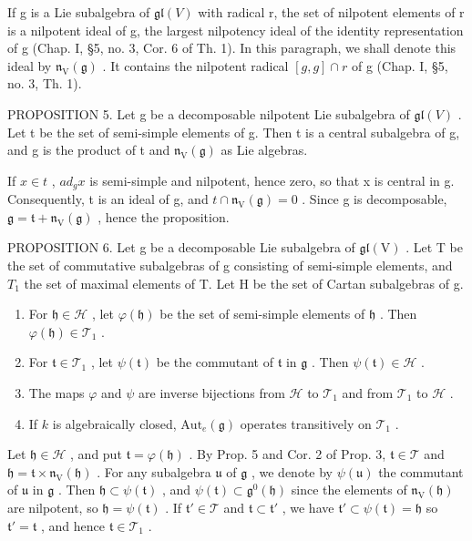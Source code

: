 If g is a Lie subalgebra of \(\mathfrak{gl}(V)\) with radical r, the set of nilpotent elements of r is a nilpotent ideal of g, the largest nilpotency ideal of the identity representation of g (Chap. I, §5, no. 3, Cor. 6 of Th. 1). In this paragraph, we shall denote this ideal by \(\mathfrak{n}_{\mathrm{V}}(\mathfrak{g})\) . It contains the nilpotent radical \([g,g]\cap r\) of g (Chap. I, §5, no. 3, Th. 1).

PROPOSITION 5. Let g be a decomposable nilpotent Lie subalgebra of \(\mathfrak{gl}(V)\) . Let t be the set of semi-simple elements of g. Then t is a central subalgebra of g, and g is the product of t and \(\mathfrak{n}_{\mathrm{V}}(\mathfrak{g})\) as Lie algebras.

If \(x \in t\) , \(ad_{g}x\) is semi-simple and nilpotent, hence zero, so that x is central in g. Consequently, t is an ideal of g, and \(t \cap \mathfrak{n}_{\mathrm{V}}(\mathfrak{g}) = 0\) . Since g is decomposable, \(\mathfrak{g} = \mathfrak{t} + \mathfrak{n}_{\mathrm{V}}(\mathfrak{g})\) , hence the proposition.

PROPOSITION 6. Let g be a decomposable Lie subalgebra of \(\mathfrak{gl}(\mathrm{V})\) . Let T be the set of commutative subalgebras of g consisting of semi-simple elements, and \(T_{1}\) the set of maximal elements of T. Let H be the set of Cartan subalgebras of g.

\begin{enumerate}
\def\labelenumi{(\roman{enumi})}
\item
  For \(\mathfrak{h} \in \mathcal{H}\) , let \(\varphi(\mathfrak{h})\) be the set of semi-simple elements of \(\mathfrak{h}\) . Then \(\varphi(\mathfrak{h}) \in \mathcal{T}_1\) .
\item
  For \(\mathfrak{t} \in \mathcal{T}_1\) , let \(\psi(\mathfrak{t})\) be the commutant of \(\mathfrak{t}\) in \(\mathfrak{g}\) . Then \(\psi(\mathfrak{t}) \in \mathscr{H}\) .
\item
  The maps \(\varphi\) and \(\psi\) are inverse bijections from \(\mathcal{H}\) to \(\mathcal{T}_1\) and from \(\mathcal{T}_1\) to \(\mathcal{H}\) .
\item
  If \(k\) is algebraically closed, \(\mathrm{Aut}_e(\mathfrak{g})\) operates transitively on \(\mathcal{T}_1\) .
\end{enumerate}

Let \(\mathfrak{h} \in \mathcal{H}\) , and put \(\mathfrak{t} = \varphi(\mathfrak{h})\) . By Prop. 5 and Cor. 2 of Prop. 3, \(\mathfrak{t} \in \mathcal{T}\) and \(\mathfrak{h} = \mathfrak{t} \times \mathfrak{n}_{\mathrm{V}}(\mathfrak{h})\) . For any subalgebra \(\mathfrak{u}\) of \(\mathfrak{g}\) , we denote by \(\psi(\mathfrak{u})\) the commutant of \(\mathfrak{u}\) in \(\mathfrak{g}\) . Then \(\mathfrak{h} \subset \psi(\mathfrak{t})\) , and \(\psi(\mathfrak{t}) \subset \mathfrak{g}^0(\mathfrak{h})\) since the elements of \(\mathfrak{n}_{\mathrm{V}}(\mathfrak{h})\) are nilpotent, so \(\mathfrak{h} = \psi(\mathfrak{t})\) . If \(\mathfrak{t}' \in \mathcal{T}\) and \(\mathfrak{t} \subset \mathfrak{t}'\) , we have \(\mathfrak{t}' \subset \psi(\mathfrak{t}) = \mathfrak{h}\) so \(\mathfrak{t}' = \mathfrak{t}\) , and hence \(\mathfrak{t} \in \mathcal{T}_1\) .

